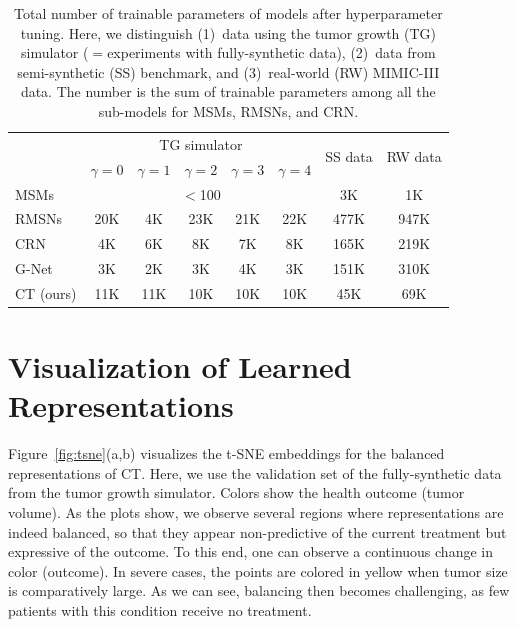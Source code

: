 \documentclass{article}
\theoremstyle{plain}
\theoremstyle{definition}
\theoremstyle{remark}
\newcommand{\shortname}{CT\xspace}
\begin{document}
\begin{table}[h!]
    \centering
    
    \caption{Total number of trainable parameters of models after hyperparameter tuning. Here, we distinguish (1)~data using the tumor growth (TG) simulator ($=$experiments with fully-synthetic data), (2)~data from semi-synthetic (SS) benchmark, and (3)~real-world (RW) MIMIC-III data. The number is the sum of trainable parameters among all the sub-models for MSMs, RMSNs, and CRN.}
    \label{tab:num_params}
    \vskip 0.1in
    \begin{small}
    \begin{tabular}{l|ccccc|c|c}
        \toprule
                    & \multicolumn{5}{c|}{TG simulator} & \multirow{2}{*}{SS data} & \multirow{2}{*}{RW data}\\
                    & $\gamma = 0$ & $\gamma = 1$ & $\gamma = 2$ & $\gamma = 3$ & $\gamma = 4$ & & \\
        \midrule
         MSMs       & \multicolumn{5}{c|}{$<$100} & 3K & 1K \\
         RMSNs      & 20K   & 4K    & 23K   & 21K   & 22K   & 477K  & 947K \\
         CRN        & 4K    & 6K    & 8K    & 7K    & 8K    & 165K  & 219K \\
         G-Net      &  3K    & 2K   & 3K    & 4K    & 3K    & 151K  & 310K \\
         \midrule
         CT (ours)  &  11K   & 11K  & 10K   & 10K   & 10K   & 45K   & 69K   \\
         \bottomrule
    \end{tabular}
    \end{small}
    \vskip -0.1in
\end{table}

\clearpage
\section{Visualization of Learned Representations} 
\label{app:t-sne}
Figure~\ref{fig:tsne}(a,b) visualizes the t-SNE embeddings for the balanced representations of \shortname. Here, we use the validation set of the fully-synthetic data from the tumor growth simulator. Colors show the health outcome (tumor volume). As the plots show, we observe several regions  where representations are indeed balanced, so that they appear non-predictive of the current treatment but expressive of the outcome. To this end, one can observe a continuous change in color (outcome). In severe cases, the points are colored in yellow when tumor size is comparatively large. As we can see, balancing then becomes challenging, as few patients with this condition receive no treatment.
\end{document}
